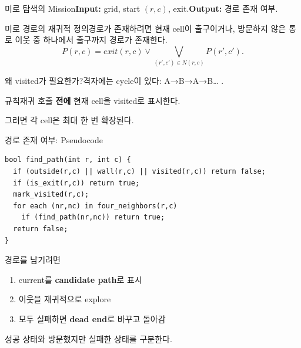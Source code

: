 \begin{frame}{미로 탐색의 Mission}\textbf{Input:} grid, start $(r,c)$, exit.\quad \textbf{Output:} 경로 존재 여부.
\end{frame}
\begin{frame}{미로 경로의 재귀적 정의}경로가 존재하려면 현재 cell이 출구이거나, 방문하지 않은 통로 이웃 중 하나에서 출구까지 경로가 존재한다.\[P(r,c)=exit(r,c)\lor\bigvee_{(r',c')\in N(r,c)}P(r',c').\]
\end{frame}
\begin{frame}{왜 visited가 필요한가?}격자에는 cycle이 있다: A→B→A→B… .\begin{alertblock}{규칙}재귀 호출 \textbf{전에} 현재 cell을 visited로 표시한다.\end{alertblock}그러면 각 cell은 최대 한 번 확장된다.
\end{frame}
\begin{frame}[fragile]{경로 존재 여부: Pseudocode}\begin{lstlisting}
bool find_path(int r, int c) {
  if (outside(r,c) || wall(r,c) || visited(r,c)) return false;
  if (is_exit(r,c)) return true;
  mark_visited(r,c);
  for each (nr,nc) in four_neighbors(r,c)
    if (find_path(nr,nc)) return true;
  return false;
}
\end{lstlisting}
\vfill{}
\end{frame}
\begin{frame}{경로를 남기려면}\begin{enumerate}\item current를 \textbf{candidate path}로 표시\item 이웃을 재귀적으로 explore\item 모두 실패하면 \textbf{dead end}로 바꾸고 돌아감\end{enumerate}성공 상태와 방문했지만 실패한 상태를 구분한다.
\end{frame}
